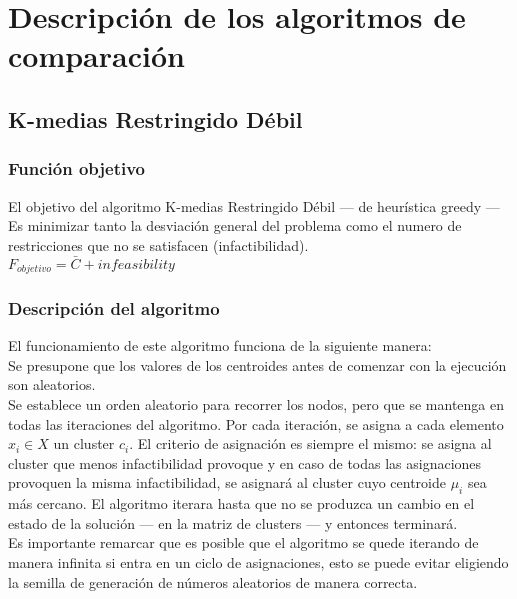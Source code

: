 \chapter{Descripción de los algoritmos de comparación}
\section{K-medias Restringido Débil}
\subsection{Función objetivo}
El objetivo del algoritmo K-medias Restringido Débil --- de heurística greedy --- Es minimizar tanto la desviación general del problema como el numero de restricciones que no se satisfacen (infactibilidad). \\
$ F_{objetivo} = \bar{C} + infeasibility $

\subsection{Descripción del algoritmo}
El funcionamiento de este algoritmo funciona de la siguiente manera:\\
Se presupone que los valores de los centroides antes de comenzar con la ejecución son aleatorios.\\
Se establece un orden aleatorio para recorrer los nodos, pero que se mantenga en todas las iteraciones del algoritmo. Por cada iteración, se asigna a cada elemento $ x_{i} \in X $ un cluster $ c_{i} $. El criterio de asignación es siempre el mismo: se asigna al cluster que menos infactibilidad provoque y en caso de todas las asignaciones provoquen la misma infactibilidad, se asignará al cluster cuyo centroide  $ \mu_{i} $ sea más cercano.
El algoritmo iterara hasta que no se produzca un cambio en el estado de la solución --- en la matriz de clusters --- y entonces terminará.\\
Es importante remarcar que es posible que el algoritmo se quede iterando de manera infinita si entra en un ciclo de asignaciones, esto se puede evitar eligiendo la semilla de generación de números aleatorios de manera correcta.

